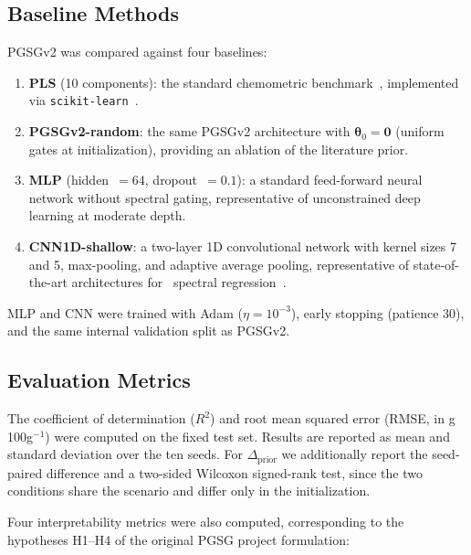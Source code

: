 \documentclass[preprint,12pt,hidelinks]{elsarticle}
\begin{document}
\subsection{Baseline Methods}

PGSGv2 was compared against four baselines:

\begin{enumerate}
  \item \textbf{PLS} (10 components): the standard chemometric
        benchmark~\cite{wold2001,naes2002}, implemented via \texttt{scikit-learn}~\cite{pedregosa2011}.

  \item \textbf{PGSGv2-random}: the same PGSGv2 architecture with
        $\boldsymbol{\theta}_0 = \mathbf{0}$ (uniform gates at
        initialization), providing an ablation of the literature prior.

  \item \textbf{MLP} (hidden~$= 64$, dropout~$= 0.1$): a standard
        feed-forward neural network without spectral gating, representative
        of unconstrained deep learning at moderate depth.

  \item \textbf{CNN1D-shallow}: a two-layer 1D convolutional network
        with kernel sizes 7 and 5, max-pooling, and adaptive average
        pooling, representative of state-of-the-art architectures for~\cite{cui2018,acquarelli2017,walsh2023review}
        spectral regression~\cite{walsh2024,mishra2021synergistic}.
\end{enumerate}

MLP and CNN were trained with Adam ($\eta = 10^{-3}$), early stopping
(patience 30), and the same internal validation split as PGSGv2.

\subsection{Evaluation Metrics}

The coefficient of determination ($R^2$) and root mean squared error
(RMSE, in g\,100g$^{-1}$) were computed on the fixed test set. Results
are reported as mean and standard deviation over the ten seeds. For
$\Delta_\mathrm{prior}$ we additionally report the seed-paired difference and
a two-sided Wilcoxon signed-rank test, since the two conditions share the
scenario and differ only in the initialization.

Four interpretability metrics were also computed, corresponding to the
hypotheses H1--H4 of the original PGSG project formulation:
\end{document}
